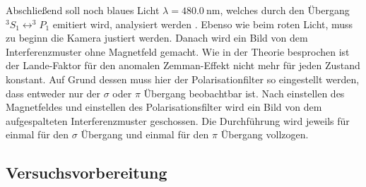 Abschließend soll noch blaues Licht $\lambda=\SI{480.0}{\nm}$, welches durch den Übergang $^3S_1\leftrightarrow ^3\!\!P_1$ emitiert wird,
analysiert werden \cite{anleitung27}. Ebenso wie beim roten Licht, muss zu beginn die Kamera justiert werden.
Danach wird ein Bild von dem Interferenzmuster ohne Magnetfeld gemacht. Wie in der Theorie besprochen ist der
Lande-Faktor für den anomalen Zemman-Effekt nicht mehr für jeden Zustand konstant. Auf Grund dessen muss hier der Polarisationfilter
so eingestellt werden, dass entweder nur der $\sigma$ oder $\pi$ Übergang beobachtbar ist. Nach einstellen des Magnetfeldes
und einstellen des Polarisationsfilter wird ein Bild von dem aufgespalteten Interferenzmuster geschossen. Die Durchführung wird jeweils für
einmal für den $\sigma$ Übergang und einmal für den $\pi$ Übergang vollzogen.


\subsection{Versuchsvorbereitung}
